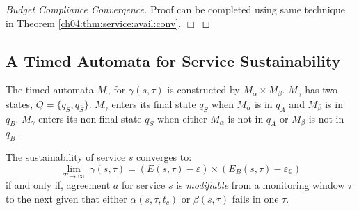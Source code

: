 \begin{proof}[Budget Compliance Convergence]
Proof can be completed using same technique in Theorem \ref{ch04:thm:service:avail:conv}.
\newline$\Box$
\end{proof}

\subsection{A Timed Automata for Service Sustainability}
\label{ch04:sec:sustain}

The timed automata $M_\gamma$ for $\gamma(s,\tau)$ is constructed by $M_\alpha \times M_\beta$.
$M_\gamma$ has two states, $Q = \{ q_S, q_{\overline{S}}\}$.
$M_\gamma$ enters its final state $q_S$ when $M_\alpha$ is in $q_A$ and $M_\beta$ is in $q_B$.
$M_\gamma$ enters its non-final state $q_{\overline{S}}$ when either $M_\alpha$ is not in $q_A$ or $M_\beta$ is not in $q_B$.

\begin{theorem}
\label{ch04:thm:sustain:conv}
The sustainability of service $s$ converges to:
$$
\lim_{T \to \infty} \; \gamma(s, \tau) = (E(s,\tau) - \varepsilon) \times (E_B(s,\tau) - \varepsilon_{\euro})
$$
if and only if, agreement $a$ for service $s$ is \emph{modifiable} from a monitoring window $\tau$ to the next given that either $\alpha(s,\tau,t_c)$ or $\beta(s,\tau)$ fails in one $\tau$.
\end{theorem}

